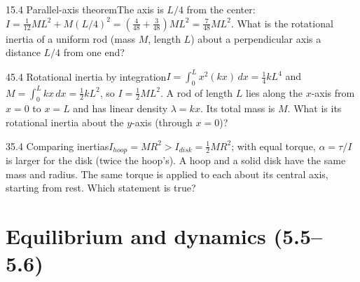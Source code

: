 \documentclass[11pt]{article}
\begin{document}
\begin{q}{1}{5.4 Parallel-axis theorem}{The axis is $L/4$ from the center: $I = \tfrac1{12}ML^2 + M(L/4)^2 = \left(\tfrac{4}{48} + \tfrac{3}{48}\right)ML^2 = \tfrac{7}{48}ML^2$.}
What is the rotational inertia of a uniform rod (mass $M$, length $L$) about a perpendicular axis a distance $L/4$ from one end?
\end{q}
\begin{q}{4}{5.4 Rotational inertia by integration}{$I = \int_0^L x^2(kx)\,dx = \tfrac14 kL^4$ and $M = \int_0^L kx\,dx = \tfrac12 kL^2$, so $I = \tfrac12 ML^2$.}
A rod of length $L$ lies along the $x$-axis from $x = 0$ to $x = L$ and has linear density $\lambda = kx$. Its total mass is $M$. What is its rotational inertia about the $y$-axis (through $x = 0$)?
\end{q}
\begin{q}{3}{5.4 Comparing inertias}{$I_{hoop} = MR^2 > I_{disk} = \tfrac12 MR^2$; with equal torque, $\alpha = \tau/I$ is larger for the disk (twice the hoop's).}
A hoop and a solid disk have the same mass and radius. The same torque is applied to each about its central axis, starting from rest. Which statement is true?
\end{q}

\section{Equilibrium and dynamics (5.5--5.6)}
\end{document}
